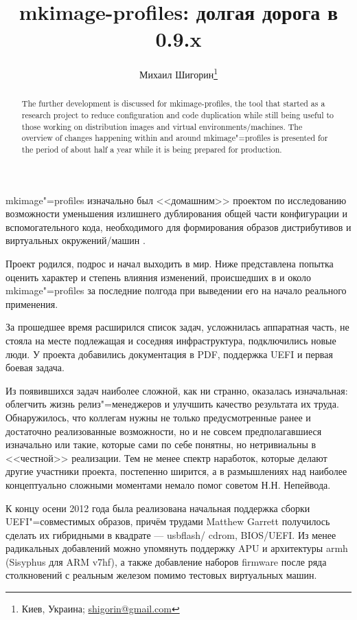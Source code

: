 \documentclass[10pt, a5paper]{article}
\begin{document}
\title{mkimage-profiles: долгая дорога в 0.9.x}%

\author{Михаил Шигорин\footnote{Киев, Украина; \url{shigorin@gmail.com}}}
\maketitle

\begin{abstract}
The further development is discussed for mkimage-profiles, the tool that started as a research project to reduce configuration and code duplication while still being useful to those working on distribution images and virtual environments/machines. The overview of changes happening within and around mkimage"=profiles is presented for the period of about half a year while it is being prepared for production.
\end{abstract}

mkimage"=profiles изначально был <<домашним>> проектом по исследованию возможности уменьшения излишнего дублирования общей части конфигурации и вспомогательного кода, необходимого для формирования образов дистрибутивов и виртуальных окружений/машин \cite{Shigorinw1}.

Проект родился, подрос и начал выходить в мир. Ниже представлена попытка оценить характер и степень влияния изменений, происшедших в и около mkimage"=profiles за последние полгода при выведении его на начало реального применения.

За прошедшее время расширился список задач, усложнилась аппаратная часть, не стояла на месте подлежащая и соседняя инфраструктура, подключились новые люди. У проекта добавились документация в PDF, поддержка UEFI и первая боевая задача.

Из появившихся задач наиболее сложной, как ни странно, оказалась изначальная: облегчить жизнь релиз"=менеджеров и улучшить качество результата их труда. Обнаружилось, что коллегам нужны не только предусмотренные ранее и достаточно реализованные возможности, но и не совсем предполагавшиеся изначально или такие, которые сами по себе понятны, но нетривиальны в <<честной>> реализации.  Тем не менее спектр наработок, которые делают другие участники проекта, постепенно ширится, а в размышлениях над наиболее концептуально сложными моментами немало помог советом Н.Н. Непейвода.

К концу осени 2012 года была реализована начальная поддержка сборки UEFI"=совместимых образов, причём трудами Matthew Garrett получилось сделать их гибридными в квадрате --- usbflash/ \linebreak cdrom, BIOS/UEFI.  Из менее радикальных добавлений можно упомянуть поддержку APU и архитектуры armh (Sisyphus для ARM v7hf), а также добавление наборов firmware после ряда столкновений с реальным железом помимо тестовых виртуальных машин.
\end{document}
